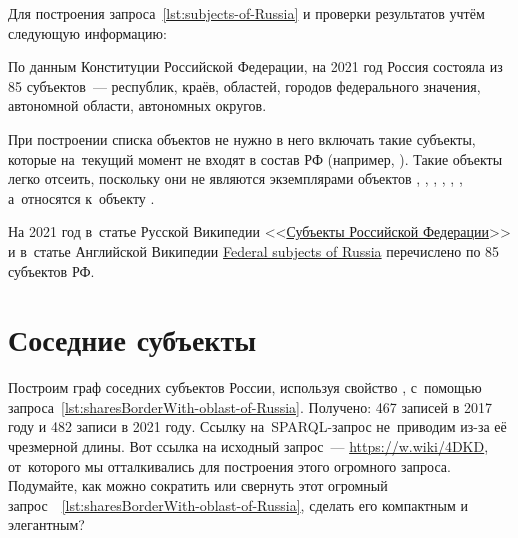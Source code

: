 Для построения запроса~\ref{lst:subjects-of-Russia} и проверки результатов учтём следующую информацию:
\begin{compactitemize}
  \item По данным Конституции Российской Федерации, на 2021 год Россия состояла из 85 субъектов~--- республик, краёв, областей, городов федерального значения, автономной области, автономных округов.
  \item При построении списка объектов не нужно в него включать такие субъекты, 
      которые на~текущий момент не входят в состав РФ (например, ). 
      Такие объекты легко отсеить, поскольку 
        они не являются экземплярами объектов , 
        , 
        , 
        , 
        , 
        , 
      а~относятся к~объекту . 
  \item На 2021 год в~статье Русской Википедии <<\href{https://ru.wikipedia.org/?curid=1042}{Субъекты Российской Федерации}>> 
        и в~статье Английской Википедии 
        \href{https://en.wikipedia.org/wiki/Federal_subjects_of_Russia}{Federal subjects of Russia} 
        перечислено по 85 субъектов РФ.
\end{compactitemize}





\section{Соседние субъекты}

Построим граф соседних субъектов России, используя свойство , 
с~помощью запроса~\ref{lst:sharesBorderWith-oblast-of-Russia}.
Получено: 467 записей в 2017 году 
и 482 записи в 2021 году. 
Ссылку на~SPARQL-запрос не~приводим из-за её чрезмерной длины. 
Вот ссылка на исходный запрос~--- \href{https://w.wiki/4DKD}
                                       {https://w.wiki/4DKD}, 
от~которого мы отталкивались для построения этого огромного запроса. 
Подумайте, как можно сократить или свернуть 
этот огромный запрос~~\ref{lst:sharesBorderWith-oblast-of-Russia}, 
сделать его компактным и элегантным?



